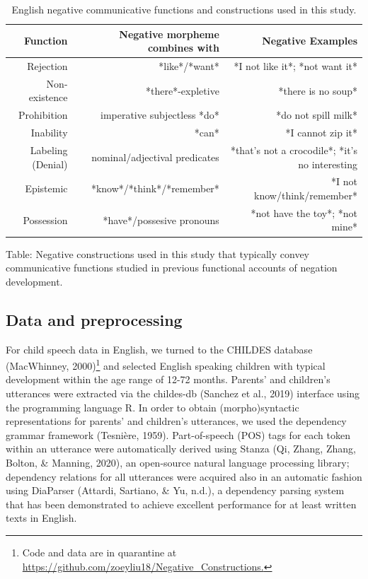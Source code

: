 \documentclass[
  english,
  man,floatsintext]{apa6}
\begin{document}
\begin{table}[h]
\small
\centering
\begin{tabular}{rrr}
\hline
\textbf{Function} & \textbf{Negative morpheme combines with} & \textbf{Negative Examples} \\
\hline
Rejection & *like*/*want* & *I not like it*; *not want it* \\
Non-existence & *there*-expletive & *there is no soup*  \\
Prohibition & imperative subjectless *do* & *do not spill milk* \\
Inability & *can* & *I cannot zip it*  \\
Labeling (Denial) & nominal/adjectival predicates & *that's not a crocodile*; *it's no interesting  \\
Epistemic & *know*/*think*/*remember*  & *I not know/think/remember*  \\
Possession & *have*/possesive pronouns & *not have the toy*; *not mine*  \\
\hline
\end{tabular}
\caption{English negative communicative functions and constructions used in this study.}
\end{table}

Table: \label{tab:constructions} Negative constructions used in this study that typically convey communicative functions studied in previous functional accounts of negation development.

\hypertarget{data-and-preprocessing}{%
\subsection{Data and preprocessing}\label{data-and-preprocessing}}

For child speech data in English, we turned to the CHILDES database (MacWhinney, 2000)\footnote{Code and data are in quarantine at \url{https://github.com/zoeyliu18/Negative_Constructions.}} and selected English speaking children with typical development within the age range of 12-72 months. Parents' and children's utterances were extracted via the childes-db (Sanchez et al., 2019) interface using the programming language R. In order to obtain (morpho)syntactic representations for parents' and children's utterances, we used the dependency grammar framework (Tesnière, 1959). Part-of-speech (POS) tags for each token within an utterance were automatically derived using Stanza (Qi, Zhang, Zhang, Bolton, \& Manning, 2020), an open-source natural language processing library; dependency relations for all utterances were acquired also in an automatic fashion using DiaParser (Attardi, Sartiano, \& Yu, n.d.), a dependency parsing system that has been demonstrated to achieve excellent performance for at least written texts in English.
\end{document}
